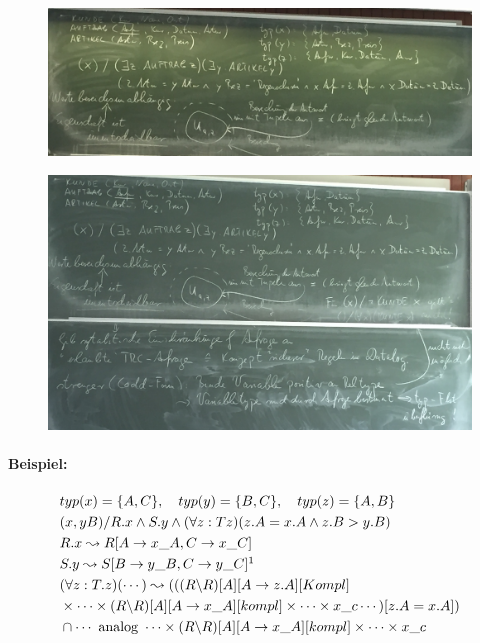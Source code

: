 \documentclass[12pt, a4paper]{article}
\begin{document}
\begin{figure}[h!]
\centering
\includegraphics[width=0.7\linewidth]{img/img22}
\caption{}
\label{fig:img22}
\end{figure}

\begin{figure}[h!]
\centering
\includegraphics[width=0.7\linewidth]{img/img23}
\caption{}
\label{fig:img23}
\end{figure}

\paragraph{Beispiel:} 
\begin{align*}
&typ(x) = \{A,C\}, \quad typ(y) = \{B,C\}, \quad typ(z) = \{A,B\} \\
& (x,y B) / R.x \wedge S.y \wedge (\forall z: Tz)(z.A = x.A \wedge z.B > y.B) \\
& R.x \leadsto R[A \rightarrow x\_A, C \rightarrow x\_C] \\
& S.y \leadsto S[B \rightarrow y\_B, C \rightarrow y\_C]\footnotemark \\
& (\forall z: T.z)(\cdots) \leadsto ((( R \backslash R)[A][A \rightarrow z.A][Kompl]  \\
&\times \cdots \times (R \backslash R)[A][A \rightarrow x\_A][kompl] \times \cdots \times x\_c \cdots)[z.A = x.A]) \\
&\cap \cdots \text{ analog } \cdots \times (R \backslash R)[A][A \rightarrow x\_A][kompl] \times \cdots \times x\_c
\end{align*}

\end{document}
